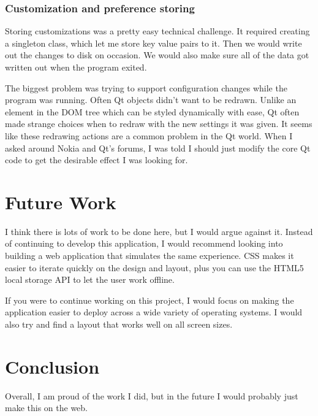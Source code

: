 \documentclass[11pt]{article}
\begin{document}
\subsubsection{Customization and preference storing}

Storing customizations was a pretty easy technical challenge. It required creating a singleton class, which let me store key value pairs to it. Then we would write out the changes to disk on occasion. We would also make sure all of the data got written out when the program exited.

The biggest problem was trying to support configuration changes while the program was running. Often Qt objects didn't want to be redrawn. Unlike an element in the DOM tree which can be styled dynamically with ease, Qt often made strange choices when to redraw with the new settings it was given. It seems like these redrawing actions are a common problem in the Qt world. When I asked around Nokia and Qt's forums, I was told I should just modify the core Qt code to get the desirable effect I was looking for.

\section{Future Work}

I think there is lots of work to be done here, but I would argue against it. Instead of continuing to develop this application, I would recommend looking into building a web application that simulates the same experience. CSS makes it easier to iterate quickly on the design and layout, plus you can use the HTML5 local storage API to let the user work offline.

If you were to continue working on this project, I would focus on making the application easier to deploy across a wide variety of operating systems. I would also try and find a layout that works well on all screen sizes.

\section{Conclusion}

Overall, I am proud of the work I did, but in the future I would probably just make this on the web.

\newpage
\nocite{*}


\end{document}
